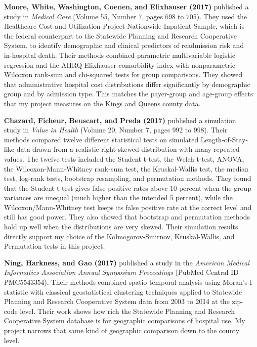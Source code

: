 \documentclass[12pt]{article}
\begin{document}
\textbf{Moore, White, Washington, Coenen, and Elixhauser (2017)}
published a study in \textit{Medical Care} (Volume 55, Number 7,
pages 698 to 705). They used the Healthcare Cost and Utilization
Project Nationwide Inpatient Sample, which is the federal counterpart
to the Statewide Planning and Research Cooperative System, to
identify demographic and clinical predictors of readmission risk and
in-hospital death. Their methods combined parametric multivariable
logistic regression and the AHRQ Elixhauser comorbidity index with
nonparametric Wilcoxon rank-sum and chi-squared tests for group
comparisons. They showed that administrative hospital cost
distributions differ significantly by demographic group and by
admission type. This matches the payer-group and age-group effects
that my project measures on the Kings and Queens county data.

\textbf{Chazard, Ficheur, Beuscart, and Preda (2017)} published a
simulation study in \textit{Value in Health} (Volume 20, Number 7,
pages 992 to 998). Their methods compared twelve different statistical
tests on simulated Length-of-Stay-like data drawn from a realistic
right-skewed distribution with many repeated values. The twelve tests
included the Student t-test, the Welch t-test, ANOVA, the
Wilcoxon-Mann-Whitney rank-sum test, the Kruskal-Wallis test, the
median test, log-rank tests, bootstrap resampling, and permutation
methods. They found that the Student t-test gives false positive rates
above 10 percent when the group variances are unequal (much higher
than the intended 5 percent), while the Wilcoxon/Mann-Whitney test
keeps its false positive rate at the correct level and still has good
power. They also showed that bootstrap and permutation methods hold up
well when the distributions are very skewed. Their simulation results
directly support my choice of the Kolmogorov-Smirnov, Kruskal-Wallis,
and Permutation tests in this project.

\textbf{Ning, Harkness, and Gao (2017)} published a study in the
\textit{American Medical Informatics Association Annual Symposium
Proceedings} (PubMed Central ID PMC5543354). Their methods combined
spatio-temporal analysis using Moran's I statistic with classical
geostatistical clustering techniques applied to Statewide Planning
and Research Cooperative System data from 2003 to 2014 at the
zip-code level. Their work shows how rich the Statewide Planning and
Research Cooperative System database is for geographic comparisons of
hospital use. My project narrows that same kind of geographic
comparison down to the county level.
\end{document}
